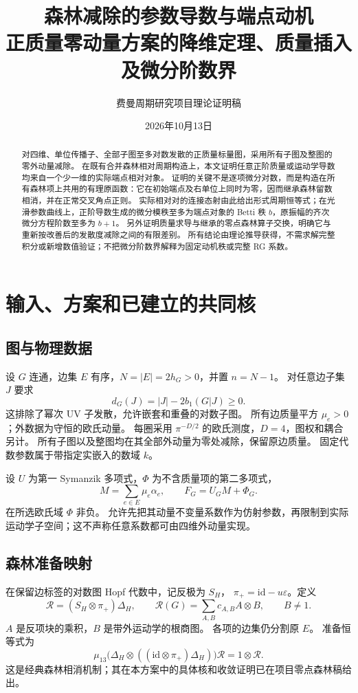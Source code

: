 \documentclass[11pt,a4paper]{ctexart}
\title{森林减除的参数导数与端点动机\\[5pt]
\large 正质量零动量方案的降维定理、质量插入及微分阶数界}
\author{费曼周期研究项目\quad 理论证明稿}
\date{2026年10月13日}
\theoremstyle{cnplain}
\theoremstyle{remark}\newtheorem{remark}[theorem]{注}
\newcommand{\cR}{\mathcal R}
\begin{document}
\maketitle
\begin{abstract}
对四维、单位传播子、全部子图至多对数发散的正质量标量图，采用所有子图及整图的零外动量减除。
在既有合并森林相对周期构造上，本文证明任意正阶质量或运动学导数均来自一个少一维的实际端点相对对象。
证明的关键不是逐项微分对数，而是构造在所有森林项上共用的有理原函数：它在初始端点及右单位上同时为零，因而继承森林留数相消，并在正常交叉角点正则。
实际相对对的连接态射由此给出形式周期恒等式；在光滑参数曲线上，正阶导数生成的微分模秩至多为端点对象的 Betti 秩 $b$，原振幅的齐次微分方程阶数至多为 $b+1$。
另外证明质量求导与继承的零点森林算子交换，明确它与重新按改善后的发散度减除之间的有限差别。
所有结论由理论推导获得，不需求解完整积分或新增数值验证；不把微分阶数界解释为固定动机秩或完整 RG 系数。
\end{abstract}

\section{输入、方案和已建立的共同核}
\subsection{图与物理数据}
设 $G$ 连通，边集 $E$ 有序，$N=|E|=2h_G>0$，并置 $n=N-1$。
对任意边子集 $J$ 要求
\begin{equation}\label{eq:power}
 d_G(J)=|J|-2b_1(G|J)\geq0.
\end{equation}
这排除了幂次 UV 子发散，允许嵌套和重叠的对数子图。
所有边质量平方 $\mu_e>0$；外数据为守恒的欧氏动量。
每圈采用 $\pi^{-D/2}$ 的欧氏测度，$D=4$，图权和耦合另计。
所有子图以及整图均在其全部外动量为零处减除，保留原边质量。
固定代数参数属于带指定实嵌入的数域 $k$。

设 $U$ 为第一 Symanzik 多项式，$\Phi$ 为不含质量项的第二多项式，
\begin{equation}\label{eq:mass}
 M=\sum_{e\in E}\mu_e\alpha_e,\qquad F_G=U_GM+\Phi_G.
\end{equation}
在所选欧氏域 $\Phi$ 非负。
允许先把其动量不变量系数作为仿射参数，再限制到实际运动学子空间；这不声称任意系数都可由四维外动量实现。

\subsection{森林准备映射}
在保留边标签的对数图 Hopf 代数中，记反极为 $S_H$，
$\pi_+=\mathrm{id}-u\varepsilon$。定义
\begin{equation}\label{eq:prep}
 \cR=(S_H\otimes\pi_+)\Delta_H,
 \qquad \cR(G)=\sum_{A,B}c_{A,B}A\otimes B,
 \qquad B\ne1.
\end{equation}
$A$ 是反项块的乘积，$B$ 是带外运动学的根商图。
各项的边集仍分割原 $E$。
准备恒等式为
\begin{equation}\label{eq:prepidentity}
 \mu_{13}\bigl(\Delta_H\otimes((\mathrm{id}\otimes\pi_+)\Delta_H)\bigr)\cR
 =1\otimes\cR.
\end{equation}
这是经典森林相消机制\cite{bk}；其在本方案中的具体核和收敛证明已在项目零点森林稿给出。
\end{document}

